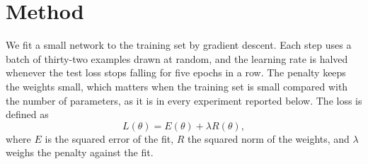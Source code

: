 \section{Method}
We fit a small network to the training set by gradient descent.
Each step uses a batch of thirty-two examples drawn at random,
and the learning rate is halved whenever the test loss stops
falling for five epochs in a row.
The penalty keeps the weights small, which matters when the
training set is small compared with the number of parameters,
as it is in every experiment reported below.
The loss is defined as
\begin{equation}
  L(\theta) = E(\theta)
  + \lambda R(\theta) ,
  \label{eq:loss}
\end{equation}
where $E$ is the squared error of the fit, $R$ the squared norm of the
weights, and $\lambda$ weighs the penalty against the fit.
